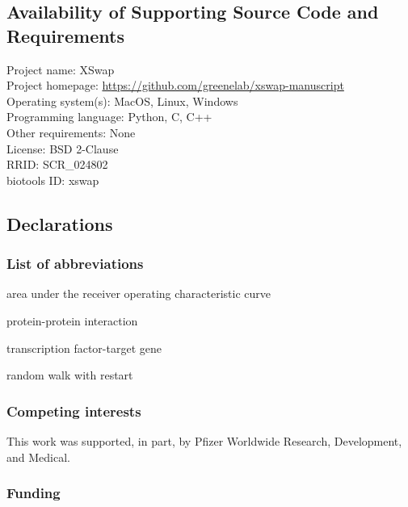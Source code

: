 \hypertarget{availability-of-supporting-source-code-and-requirements}{%
\subsection{Availability of Supporting Source Code and Requirements}\label{availability-of-supporting-source-code-and-requirements}}

Project name: XSwap\\
Project homepage: \url{https://github.com/greenelab/xswap-manuscript}\\
Operating system(s): MacOS, Linux, Windows\\
Programming language: Python, C, C++\\
Other requirements: None\\
License: BSD 2-Clause\\
RRID: SCR\_024802\\
biotools ID: xswap

\hypertarget{declarations}{%
\subsection{Declarations}\label{declarations}}

\hypertarget{list-of-abbreviations}{%
\subsubsection{List of abbreviations}\label{list-of-abbreviations}}

\begin{description}
\tightlist
\item[AUROC]
area under the receiver operating characteristic curve
\item[PPI]
protein-protein interaction
\item[TF-TG]
transcription factor-target gene
\item[RWR]
random walk with restart
\end{description}

\hypertarget{competing-interests}{%
\subsubsection{Competing interests}\label{competing-interests}}

This work was supported, in part, by Pfizer Worldwide Research, Development, and Medical.

\hypertarget{funding}{%
\subsubsection{Funding}\label{funding}}

